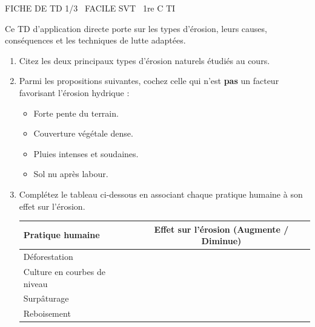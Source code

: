 \documentclass[11pt]{article}
\begin{document}
\begin{tcolorbox}[enhanced,colback=popink,colframe=popink,arc=10pt,boxrule=0pt,left=12pt,right=12pt,top=9pt,bottom=9pt]
{\color{white}\popxbold\small FICHE DE TD 1/3 \textbullet\ FACILE \hfill SVT \textbullet\ 1re C TI\par}
\end{tcolorbox}
\vspace{4pt}
Ce TD d'application directe porte sur les types d'érosion, leurs causes, conséquences et les techniques de lutte adaptées.

\begin{exercice}
\begin{enumerate}
    \item Citez les deux principaux types d'érosion naturels étudiés au cours.
    \item Parmi les propositions suivantes, cochez celle qui n'est \textbf{pas} un facteur favorisant l'érosion hydrique :
    \begin{itemize}
        \item Forte pente du terrain.
        \item Couverture végétale dense.
        \item Pluies intenses et soudaines.
        \item Sol nu après labour.
    \end{itemize}
    \item Complétez le tableau ci-dessous en associant chaque pratique humaine à son effet sur l'érosion.
    \begin{tabular}{|l|c|}
    \hline
    \textbf{Pratique humaine} & \textbf{Effet sur l'érosion (Augmente / Diminue)} \\
    \hline
    Déforestation & \\
    \hline
    Culture en courbes de niveau & \\
    \hline
    Surpâturage & \\
    \hline
    Reboisement & \\
    \hline
    \end{tabular}
\end{enumerate}
\end{exercice}
\end{document}
